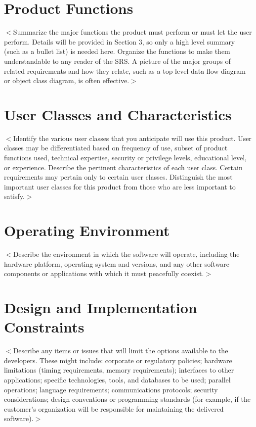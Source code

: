 \documentclass[a4paper, 11pt]{scrreprt}
\begin{document}
\section{Product Functions}
$<$Summarize the major functions the product must perform or must let the user 
perform. Details will be provided in Section 3, so only a high level summary 
(such as a bullet list) is needed here. Organize the functions to make them 
understandable to any reader of the SRS. A picture of the major groups of 
related requirements and how they relate, such as a top level data flow diagram 
or object class diagram, is often effective.$>$

\section{User Classes and Characteristics}
$<$Identify the various user classes that you anticipate will use this product.  
User classes may be differentiated based on frequency of use, subset of product 
functions used, technical expertise, security or privilege levels, educational 
level, or experience. Describe the pertinent characteristics of each user class.  
Certain requirements may pertain only to certain user classes. Distinguish the 
most important user classes for this product from those who are less important 
to satisfy.$>$

\section{Operating Environment}
$<$Describe the environment in which the software will operate, including the 
hardware platform, operating system and versions, and any other software 
components or applications with which it must peacefully coexist.$>$

\section{Design and Implementation Constraints}
$<$Describe any items or issues that will limit the options available to the 
developers. These might include: corporate or regulatory policies; hardware 
limitations (timing requirements, memory requirements); interfaces to other 
applications; specific technologies, tools, and databases to be used; parallel 
operations; language requirements; communications protocols; security 
considerations; design conventions or programming standards (for example, if the 
customer's organization will be responsible for maintaining the delivered 
software).$>$
\end{document}

